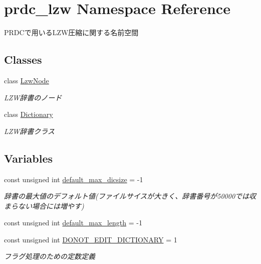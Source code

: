 \hypertarget{namespaceprdc__lzw}{\section{prdc\-\_\-lzw Namespace Reference}
\label{namespaceprdc__lzw}
}


P\-R\-D\-Cで用いる\-L\-Z\-W圧縮に関する名前空間  


\subsection*{Classes}
\begin{DoxyCompactItemize}
\item 
class \hyperlink{classprdc__lzw_1_1LzwNode}{Lzw\-Node}
\begin{DoxyCompactList}\small\item\em L\-Z\-W辞書のノード \end{DoxyCompactList}\item 
class \hyperlink{classprdc__lzw_1_1Dictionary}{Dictionary}
\begin{DoxyCompactList}\small\item\em L\-Z\-W辞書クラス \end{DoxyCompactList}\end{DoxyCompactItemize}
\subsection*{Variables}
\begin{DoxyCompactItemize}
\item 
const unsigned int \hyperlink{namespaceprdc__lzw_a32802f5b39a1712fd52ea244bed3abc6}{default\-\_\-max\-\_\-dicsize} = -\/1
\begin{DoxyCompactList}\small\item\em 辞書の最大値のデフォルト値(ファイルサイスが大きく、辞書番号が50000では収まらない場合には増やす) \end{DoxyCompactList}\item 
const unsigned int \hyperlink{namespaceprdc__lzw_a563099246f7864f678056d3c7e583dbf}{default\-\_\-max\-\_\-length} = -\/1
\item 
const unsigned int \hyperlink{namespaceprdc__lzw_acf8cc481fd2dd6347b910b0c0befdc84}{D\-O\-N\-O\-T\-\_\-\-E\-D\-I\-T\-\_\-\-D\-I\-C\-T\-I\-O\-N\-A\-R\-Y} = 1
\begin{DoxyCompactList}\small\item\em フラグ処理のための定数定義 \end{DoxyCompactList}\end{DoxyCompactItemize}


